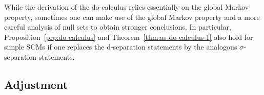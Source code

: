 While the derivation of the do-calculus relies essentially on the global Markov property, sometimes one
can make use of the global Markov property and a more careful analysis of null sets to obtain stronger conclusions.
In particular, Proposition~\ref{prp:do-calculus} and Theorem~\ref{thm:as-do-calculus-1} also hold for simple SCMs
if one replaces the d-separation statements by the analogous $\sigma$-separation statements.



\subsection{Adjustment}\label{sec:scms_adjustment}


